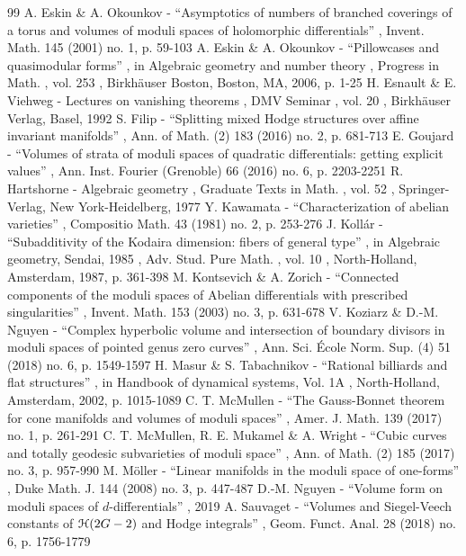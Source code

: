 \documentclass[11pt]{article}
\numberwithin{equation}{section}
\let\mathcal\EuScript
\theoremstyle{plain}
\theoremstyle{definition}
\begin{document}
\begin{thebibliography}{99}
 A. Eskin \& A. Okounkov - “Asymptotics of numbers of branched coverings of a torus and volumes of moduli spaces of holomorphic differentials” , Invent. Math. 145 (2001) no. 1, p. 59-103
 A. Eskin \& A. Okounkov - “Pillowcases and quasimodular forms” , in Algebraic geometry and number theory , Progress in Math. , vol. 253 , Birkhäuser Boston, Boston, MA, 2006, p. 1-25
 H. Esnault \& E. Viehweg - Lectures on vanishing theorems , DMV Seminar , vol. 20 , Birkhäuser Verlag, Basel, 1992
 S. Filip - “Splitting mixed Hodge structures over affine invariant manifolds” , Ann. of Math. (2) 183 (2016) no. 2, p. 681-713
 E. Goujard - “Volumes of strata of moduli spaces of quadratic differentials: getting explicit values” , Ann. Inst. Fourier (Grenoble) 66 (2016) no. 6, p. 2203-2251
 R. Hartshorne - Algebraic geometry , Graduate Texts in Math. , vol. 52 , Springer-Verlag, New York-Heidelberg, 1977
 Y. Kawamata - “Characterization of abelian varieties” , Compositio Math. 43 (1981) no. 2, p. 253-276
 J. Kollár - “Subadditivity of the Kodaira dimension: fibers of general type” , in Algebraic geometry, Sendai, 1985 , Adv. Stud. Pure Math. , vol. 10 , North-Holland, Amsterdam, 1987, p. 361-398
 M. Kontsevich \& A. Zorich - “Connected components of the moduli spaces of Abelian differentials with prescribed singularities” , Invent. Math. 153 (2003) no. 3, p. 631-678
 V. Koziarz \& D.-M. Nguyen - “Complex hyperbolic volume and intersection of boundary divisors in moduli spaces of pointed genus zero curves” , Ann. Sci. École Norm. Sup. (4) 51 (2018) no. 6, p. 1549-1597
 H. Masur \& S. Tabachnikov - “Rational billiards and flat structures” , in Handbook of dynamical systems, Vol. 1A , North-Holland, Amsterdam, 2002, p. 1015-1089
 C. T. McMullen - “The Gauss-Bonnet theorem for cone manifolds and volumes of moduli spaces” , Amer. J. Math. 139 (2017) no. 1, p. 261-291
 C. T. McMullen, R. E. Mukamel \& A. Wright - “Cubic curves and totally geodesic subvarieties of moduli space” , Ann. of Math. (2) 185 (2017) no. 3, p. 957-990
 M. Möller - “Linear manifolds in the moduli space of one-forms” , Duke Math. J. 144 (2008) no. 3, p. 447-487
 D.-M. Nguyen - “Volume form on moduli spaces of $d$-differentials” , 2019
 A. Sauvaget - “Volumes and Siegel-Veech constants of $\mathcal{H}(2G-2)$ and Hodge integrals” , Geom. Funct. Anal. 28 (2018) no. 6, p. 1756-1779

\end{thebibliography}
\end{document}
